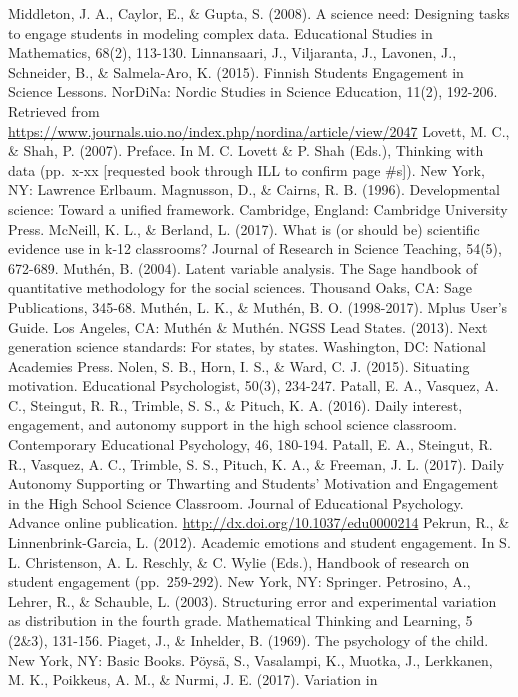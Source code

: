 \documentclass[]{msu-thesis}
\theoremstyle{definition}
\theoremstyle{definition}
\theoremstyle{definition}
\theoremstyle{remark}
\begin{document}
Middleton, J. A., Caylor, E., \& Gupta, S. (2008). A science need:
Designing tasks to engage students in modeling complex data. Educational
Studies in Mathematics, 68(2), 113-130. Linnansaari, J., Viljaranta, J.,
Lavonen, J., Schneider, B., \& Salmela-Aro, K. (2015). Finnish Students
Engagement in Science Lessons. NorDiNa: Nordic Studies in Science
Education, 11(2), 192-206. Retrieved from
\url{https://www.journals.uio.no/index.php/nordina/article/view/2047}
Lovett, M. C., \& Shah, P. (2007). Preface. In M. C. Lovett \& P. Shah
(Eds.), Thinking with data (pp.~x-xx {[}requested book through ILL to
confirm page \#s{]}). New York, NY: Lawrence Erlbaum. Magnusson, D., \&
Cairns, R. B. (1996). Developmental science: Toward a unified framework.
Cambridge, England: Cambridge University Press. McNeill, K. L., \&
Berland, L. (2017). What is (or should be) scientific evidence use in
k‐12 classrooms? Journal of Research in Science Teaching, 54(5),
672-689. Muthén, B. (2004). Latent variable analysis. The Sage handbook
of quantitative methodology for the social sciences. Thousand Oaks, CA:
Sage Publications, 345-68. Muthén, L. K., \& Muthén, B. O. (1998-2017).
Mplus User's Guide. Los Angeles, CA: Muthén \& Muthén. NGSS Lead States.
(2013). Next generation science standards: For states, by states.
Washington, DC: National Academies Press. Nolen, S. B., Horn, I. S., \&
Ward, C. J. (2015). Situating motivation. Educational Psychologist,
50(3), 234-247. Patall, E. A., Vasquez, A. C., Steingut, R. R., Trimble,
S. S., \& Pituch, K. A. (2016). Daily interest, engagement, and autonomy
support in the high school science classroom. Contemporary Educational
Psychology, 46, 180-194. Patall, E. A., Steingut, R. R., Vasquez, A. C.,
Trimble, S. S., Pituch, K. A., \& Freeman, J. L. (2017). Daily Autonomy
Supporting or Thwarting and Students' Motivation and Engagement in the
High School Science Classroom. Journal of Educational Psychology.
Advance online publication. \url{http://dx.doi.org/10.1037/edu0000214}
Pekrun, R., \& Linnenbrink-Garcia, L. (2012). Academic emotions and
student engagement. In S. L. Christenson, A. L. Reschly, \& C. Wylie
(Eds.), Handbook of research on student engagement (pp.~259-292). New
York, NY: Springer. Petrosino, A., Lehrer, R., \& Schauble, L. (2003).
Structuring error and experimental variation as distribution in the
fourth grade. Mathematical Thinking and Learning, 5 (2\&3), 131-156.
Piaget, J., \& Inhelder, B. (1969). The psychology of the child. New
York, NY: Basic Books. Pöysä, S., Vasalampi, K., Muotka, J., Lerkkanen,
M. K., Poikkeus, A. M., \& Nurmi, J. E. (2017). Variation in
\end{document}
